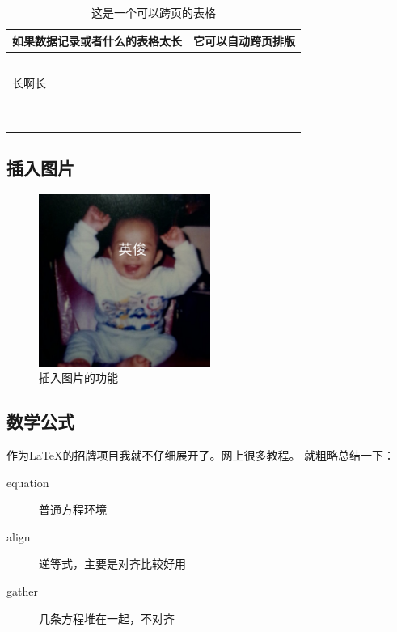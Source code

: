 \documentclass{spaexp}
\begin{document}
        \begin{longtable}{p{}||p{}}
            \caption{这是一个可以跨页的表格}\\
            \toprule
            如果数据记录或者什么的表格太长 & 它可以自动跨页排版 \\ \hline
            & \\ 
            & \\ 
            & \\ 
            & \\ 
            & \\ 
            长啊长 & \\
            & \\ 
            & \\ 
            & \\ 
            & \\ 
            & \\ 
            & \\ 
            & \\ 
            & \\ 
            & \\
            \bottomrule 
        \end{longtable}
        \clearpage
    \subsection{插入图片}
        \begin{figure}[h]
            \ct
            \caption{插入图片的功能}\label{fig:handsomeBOY}
            \includegraphics[width = 0.5\textwidth]{img/data1.png}
        \end{figure}

    \subsection{数学公式}
        作为\LaTeX 的招牌项目我就不仔细展开了。网上很多教程。
        就粗略总结一下：
        \begin{description}
            \item[equation] 普通方程环境
            \item[align] 递等式，主要是对齐比较好用
            \item[gather] 几条方程堆在一起，不对齐
        \end{description}
    
\end{document}
